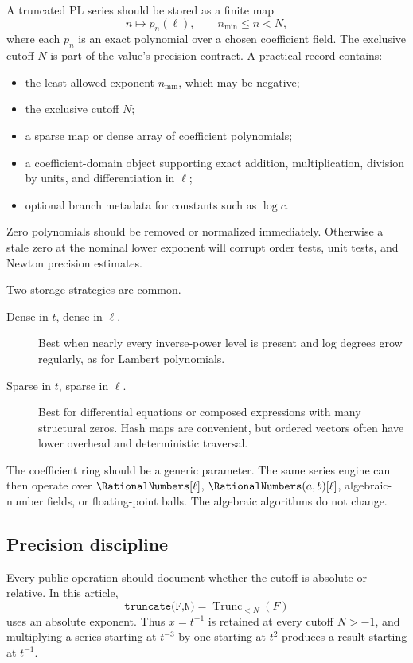 \documentclass[11pt,oneside]{article}
\numberwithin{equation}{section}
\theoremstyle{definition}
\newcommand{\TransseriesTruncateBelow}[2]{%
  \operatorname{Trunc}_{<#2}\!\left(#1\right)%
}
\begin{document}
A truncated PL series should be stored as a finite map
\begin{equation}\label{eq:data-model}
  n\longmapsto p_n(\ell),
  \qquad n_{\min}\le n<N,
\end{equation}
where each \(p_n\) is an exact polynomial over a chosen coefficient field.  The
exclusive cutoff \(N\) is part of the value's precision contract.  A practical
record contains:
\begin{itemize}
\item the least allowed exponent \(n_{\min}\), which may be negative;
\item the exclusive cutoff \(N\);
\item a sparse map or dense array of coefficient polynomials;
\item a coefficient-domain object supporting exact addition, multiplication,
  division by units, and differentiation in \(\ell\);
\item optional branch metadata for constants such as \(\log c\).
\end{itemize}
Zero polynomials should be removed or normalized immediately.  Otherwise a
stale zero at the nominal lower exponent will corrupt order tests, unit tests,
and Newton precision estimates.

Two storage strategies are common.

\begin{description}
\item[Dense in \(t\), dense in \(\ell\).]
Best when nearly every inverse-power level is present and log degrees grow
regularly, as for Lambert polynomials.
\item[Sparse in \(t\), sparse in \(\ell\).]
Best for differential equations or composed expressions with many structural
zeros.  Hash maps are convenient, but ordered vectors often have lower overhead
and deterministic traversal.
\end{description}

The coefficient ring should be a generic parameter.  The same series engine can
then operate over \(\RationalNumbers[\ell]\), \(\RationalNumbers(a,b)[\ell]\), algebraic-number fields, or
floating-point balls.  The algebraic algorithms do not change.

\subsection{Precision discipline}

Every public operation should document whether the cutoff is absolute or
relative.  In this article,
\[
  \texttt{truncate(F,N)}=\TransseriesTruncateBelow{F}{N}
\]
uses an absolute exponent.  Thus \(x=t^{-1}\) is retained at every cutoff
\(N>-1\), and multiplying a series starting at \(t^{-3}\) by one starting at
\(t^2\) produces a result starting at \(t^{-1}\).
\end{document}
